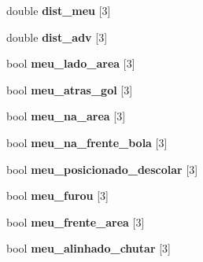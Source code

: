 \begin{DoxyCompactItemize}
\item 
double {\bfseries dist\+\_\+meu} \mbox{[}3\mbox{]}\hypertarget{classStrategy_a79835902d50beb570ee3884b6f08c521}{}\label{classStrategy_a79835902d50beb570ee3884b6f08c521}

\item 
double {\bfseries dist\+\_\+adv} \mbox{[}3\mbox{]}\hypertarget{classStrategy_a4b42297cee34e1d56bf9aa336f445ddd}{}\label{classStrategy_a4b42297cee34e1d56bf9aa336f445ddd}

\item 
bool {\bfseries meu\+\_\+lado\+\_\+area} \mbox{[}3\mbox{]}\hypertarget{classStrategy_af0fb58fe1e02f254386002132f19aab2}{}\label{classStrategy_af0fb58fe1e02f254386002132f19aab2}

\item 
bool {\bfseries meu\+\_\+atras\+\_\+gol} \mbox{[}3\mbox{]}\hypertarget{classStrategy_ad8ecaa33ed912e99071c430ff7df5242}{}\label{classStrategy_ad8ecaa33ed912e99071c430ff7df5242}

\item 
bool {\bfseries meu\+\_\+na\+\_\+area} \mbox{[}3\mbox{]}\hypertarget{classStrategy_a62d3d223382aaba00bfda11dd9eff8eb}{}\label{classStrategy_a62d3d223382aaba00bfda11dd9eff8eb}

\item 
bool {\bfseries meu\+\_\+na\+\_\+frente\+\_\+bola} \mbox{[}3\mbox{]}\hypertarget{classStrategy_aef00427ede03c683473078dee5dc5e2d}{}\label{classStrategy_aef00427ede03c683473078dee5dc5e2d}

\item 
bool {\bfseries meu\+\_\+posicionado\+\_\+descolar} \mbox{[}3\mbox{]}\hypertarget{classStrategy_af3677b1dc4ff9826e7f91fef0cc98616}{}\label{classStrategy_af3677b1dc4ff9826e7f91fef0cc98616}

\item 
bool {\bfseries meu\+\_\+furou} \mbox{[}3\mbox{]}\hypertarget{classStrategy_af8bcab398f2eb78997376922db35402e}{}\label{classStrategy_af8bcab398f2eb78997376922db35402e}

\item 
bool {\bfseries meu\+\_\+frente\+\_\+area} \mbox{[}3\mbox{]}\hypertarget{classStrategy_a35366fddcaf7f475539dd2c9d4885f40}{}\label{classStrategy_a35366fddcaf7f475539dd2c9d4885f40}

\item 
bool {\bfseries meu\+\_\+alinhado\+\_\+chutar} \mbox{[}3\mbox{]}\hypertarget{classStrategy_a135ab0f7a075f108779b5b7c48e56389}{}\label{classStrategy_a135ab0f7a075f108779b5b7c48e56389}


\end{DoxyCompactItemize}
